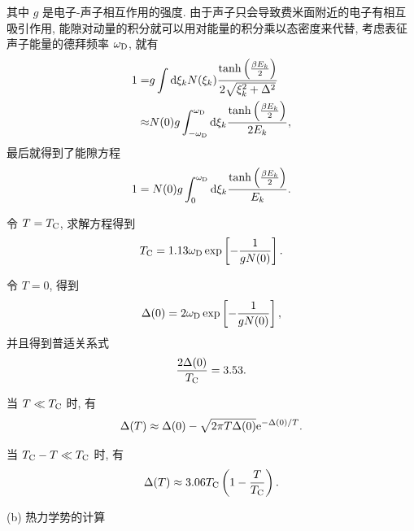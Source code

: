 其中 $g$ 是电子-声子相互作用的强度. 由于声子只会导致费米面附近的电子有相互吸引作用, 能隙对动量的积分就可以用对能量的积分乘以态密度来代替, 考虑表征声子能量的德拜频率 $\omega_{\mathrm{D}}$, 就有 
 \begin{align}
        1=&g\int\mathrm{d}\xi_k N(\xi_k)\frac{\tanh\left( \frac{\beta E_k}{2} \right)}{2\sqrt{\xi_k^2+\Delta^2}} \nonumber \\
        \approx&N(0)g\int_{-\omega_{\mathrm{D}}}^{\omega_{\mathrm{D}}}\mathrm{d}\xi_k\frac{\tanh\left( \frac{\beta E_k}{2} \right)}{2 E_k},
    \end{align}
最后就得到了能隙方程 
\begin{equation}
    1=N(0)g\int_0^{\omega_{\mathrm{D}}}\mathrm{d}\xi_k\frac{\tanh\left( \frac{\beta E_k}{2} \right)}{E_k}.
\end{equation}

令 $T=T_{\mathrm{C}}$, 求解方程得到 
\begin{equation}
    T_{\mathrm{C}}=1.13\omega_{\mathrm{D}}\exp\left[ -\frac{1}{gN(0)} \right].
\end{equation}

令 $T=0$, 得到 
\begin{equation}
    \Delta(0)=2\omega_{\mathrm{D}}\exp\left[ -\frac{1}{gN(0)} \right],
\end{equation}
并且得到普适关系式 
\begin{equation}
    \frac{2\Delta(0)}{T_{\mathrm{C}}}=3.53.
\end{equation}

当 $T\ll T_{\mathrm{C}}$ 时, 有 
\begin{equation}
    \Delta(T)\approx \Delta(0)-\sqrt{ 2\pi T\Delta(0) } \mathrm{e}^{-\Delta(0)/T}.
\end{equation}

当 $T_{\mathrm{C}}-T\ll T_{\mathrm{C}}$ 时, 有 
\begin{equation}
    \Delta(T)\approx 3.06 T_{\mathrm{C}}\left( 1-\frac{T}{T_{\mathrm{C}}} \right).
\end{equation}

(b) 热力学势的计算 

